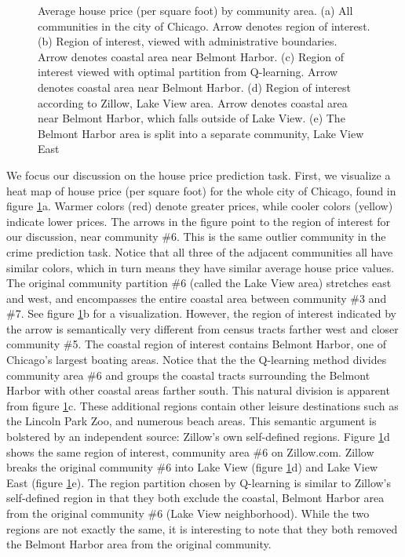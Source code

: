 \begin{figure}
\caption{Average house price (per square foot) by community area. (a) All communities in the city of Chicago. Arrow denotes region of interest. (b) Region of interest, viewed with administrative boundaries. Arrow denotes coastal area near Belmont Harbor. (c) Region of interest viewed with optimal partition from Q-learning. Arrow denotes coastal area near Belmont Harbor. (d) Region of interest according to Zillow, Lake View area. Arrow denotes coastal area near Belmont Harbor, which falls outside of Lake View. (e) The Belmont Harbor area is split into a separate community, Lake View East}
\label{fig:housePrice}
\end{figure}

We focus our discussion on the house price prediction task. First, we visualize a heat map of house price (per square foot) for the whole city of Chicago, found in figure \ref{fig:housePrice}a. Warmer colors (red) denote greater prices, while cooler colors (yellow) indicate lower prices. The arrows in the figure point to the region of interest for our discussion, near community \#6. This is the same outlier community in the crime prediction task. Notice that all three of the adjacent communities all have similar colors, which in turn means they have similar average house price values. The original community partition \#6 (called the Lake View area) stretches east and west, and encompasses the entire coastal area between community \#3 and \#7. See figure \ref{fig:housePrice}b for a visualization. However, the region of interest indicated by the arrow is semantically very different from census tracts farther west and closer community \#5. The coastal region of interest contains Belmont Harbor, one of Chicago's largest boating areas. Notice that the the Q-learning method divides community area \#6 and groups the coastal tracts surrounding the Belmont Harbor with other coastal areas farther south. This natural division is apparent from figure \ref{fig:housePrice}c. These additional regions contain other leisure destinations such as the Lincoln Park Zoo, and numerous beach areas. This semantic argument is bolstered by an independent source: Zillow's own self-defined regions. Figure \ref{fig:housePrice}d shows the same region of interest, community area \#6 on Zillow.com. Zillow breaks the original community \#6 into Lake View (figure \ref{fig:housePrice}d) and Lake View East (figure \ref{fig:housePrice}e). The region partition chosen by Q-learning is similar to Zillow's self-defined region in that they both exclude the coastal, Belmont Harbor area from the original community \#6 (Lake View neighborhood). While the two regions are not exactly the same, it is interesting to note that they both removed the Belmont Harbor area from the original community.

